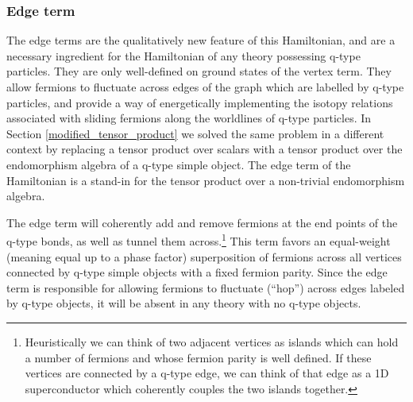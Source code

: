 \subsubsection{Edge term} 
\label{edge_term}

The edge terms are the qualitatively new feature of this Hamiltonian, and are a necessary ingredient for the Hamiltonian of any theory possessing q-type particles. 
They are only well-defined on ground states of the vertex term. 
They allow fermions to fluctuate across edges of the graph which are labelled by q-type particles,
and provide a way of energetically implementing the isotopy relations associated with sliding fermions along the worldlines of q-type particles. 
In Section \ref{modified_tensor_product} we solved the same problem in
a different context by replacing a tensor product over scalars with a tensor product
over the endomorphism algebra of a q-type simple object.
The edge term of the Hamiltonian is a stand-in for the tensor product over a non-trivial endomorphism algebra.



The edge term will coherently add and remove fermions at the end points of the q-type bonds, as well as tunnel them across.\footnote{Heuristically we can think of two adjacent vertices as islands which can hold a number of fermions and whose fermion parity is well defined. 
If these vertices are connected by a q-type edge, we can think of that edge as a 1D superconductor which coherently couples the two islands together.}
This term favors an equal-weight (meaning equal up to a phase factor) 
superposition of fermions across all vertices connected by 
q-type simple objects with a fixed fermion parity.
Since the edge term is responsible for allowing fermions to fluctuate (``hop'') across edges labeled by q-type objects, 
it will be absent in any theory with no q-type objects.

